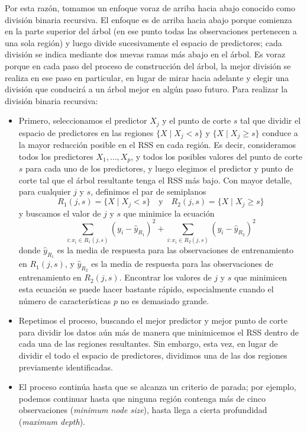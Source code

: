 Por esta razón, tomamos un enfoque voraz de arriba hacia abajo conocido como división binaria recursiva. El enfoque es de arriba hacia abajo porque comienza en la parte superior del árbol (en ese punto todas las observaciones pertenecen a una sola región) y luego divide sucesivamente el espacio de predictores; cada división se indica mediante dos nuevas ramas más abajo en el árbol. Es voraz porque en cada paso del proceso de construcción del árbol, la mejor división se realiza en ese paso en particular, en lugar de mirar hacia adelante y elegir una división que conducirá a un árbol mejor en algún paso futuro. Para realizar la división binaria recursiva:
\begin{itemize}
\item Primero, seleccionamos el predictor $X_j$ y el punto de corte $s$ tal que dividir el espacio de predictores en las regiones $\{X \mid X_j < s\}$ y $\{X \mid X_j \geq s\}$ conduce a la mayor reducción posible en el RSS en cada región. Es decir, consideramos todos los predictores $X_1, \ldots, X_p$, y todos los posibles valores del punto de corte $s$ para cada uno de los predictores, y luego elegimos el predictor y punto de corte tal que el árbol resultante tenga el RSS más bajo. Con mayor detalle, para cualquier $j$ y $s$, definimos el par de semiplanos
\begin{equation}
R_1(j, s) = \{X \mid X_j < s\} \quad \text{y} \quad R_2(j, s) = \{X \mid X_j \geq s\}
\end{equation}
\noindent y buscamos el valor de $j$ y $s$ que minimice la ecuación
\begin{equation}
\sum_{i: x_i \in R_1(j, s)} (y_i - \hat{y}_{R_1})^2 + \sum_{i: x_i \in R_2(j, s)} (y_i - \hat{y}_{R_2})^2
\end{equation}
donde $\hat{y}_{R_1}$ es la media de respuesta para las observaciones de entrenamiento en $R_1(j, s)$, y $\hat{y}_{R_2}$ es la media de respuesta para las observaciones de entrenamiento en $R_2(j, s)$. Encontrar los valores de $j$ y $s$ que minimicen esta ecuación se puede hacer bastante rápido, especialmente cuando el número de características $p$ no es demasiado grande.
\item Repetimos el proceso, buscando el mejor predictor y mejor punto de corte para dividir los datos aún más de manera que minimicemos el RSS dentro de cada una de las regiones resultantes. Sin embargo, esta vez, en lugar de dividir el todo el espacio de predictores, dividimos una de las dos regiones previamente identificadas. 
\item El proceso continúa hasta que se alcanza un criterio de parada; por ejemplo, podemos continuar hasta que ninguna región contenga más de cinco observaciones (\textit{minimum node size}), hasta llega a cierta profundidad (\textit{maximum depth}).

\end{itemize}
